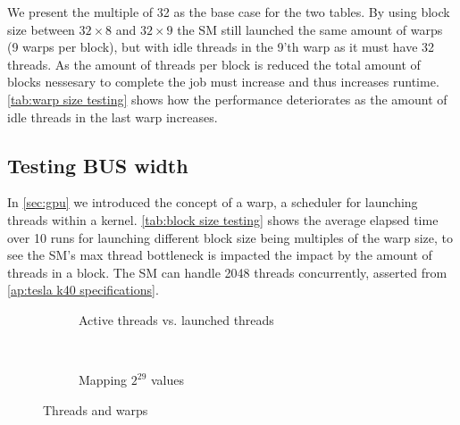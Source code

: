 We present the multiple of 32 as the base case for the two tables.
By using block size between $32 \times 8$ and $32 \times 9$ the SM still launched the same amount of warps (9 warps per block), but with idle threads in the 9'th warp as it must have 32 threads.
As the amount of threads per block is reduced the total amount of blocks nessesary to complete the job must increase and thus increases runtime.
\cref{tab:warp size testing} shows how the performance deteriorates as the amount of idle threads in the last warp increases.

\subsection{Testing BUS width}
\label{sec:testing BUS width}

In \cref{sec:gpu} we introduced the concept of a warp, a scheduler for launching threads within a kernel.
\cref{tab:block size testing} shows the average elapsed time over 10 runs for launching different block size being multiples of the warp size, to see the SM's max thread bottleneck is impacted the impact by the amount of threads in a block.
The SM can handle 2048 threads concurrently, asserted from \cref{ap:tesla k40 specifications}.


\begin{figure*}[t]
  \centering
  \begin{subfigure}[b]{.49\linewidth}
    \centering
    \resizebox{!}{.80\textwidth}{
      
    }
    \caption{Active threads vs. launched threads}
    \label{fig:active threads}
  \end{subfigure}%
  ~
  \begin{subfigure}[b]{.49\linewidth}
    \centering
    \resizebox{!}{.80\textwidth}{
      
    }
    \caption{Mapping $2^{29}$ values}
    \label{fig:block size testing}
  \end{subfigure}%
  \caption{Threads and warps}
  \label{fig:threads and warps}
\end{figure*}

